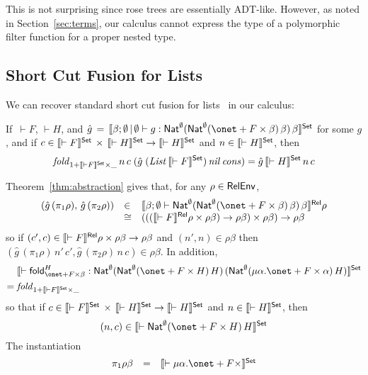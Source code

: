 \documentclass{lmcs}
\theoremstyle{plain}\newtheorem{satz}[thm]{Satz}
\newcommand{\fold}{\mathsf{fold}}
\begin{document}
{\noindent
This is not surprising since rose trees are essentially
ADT-like. However, as noted in Section~\ref{sec:terms}, our calculus
cannot express the type of a polymorphic filter function for a proper
nested type.

\subsection{Short Cut Fusion for Lists}\label{sec:short-cut}

We can recover standard short cut fusion for lists~\cite{glp93} in our
calculus: 
\begin{thm}
If \,$\vdash F$, $\vdash H$, and 
$\hat{g} \, = \, \setsem{\beta; \emptyset \,|\, \emptyset \vdash g :
  \Nat^{\emptyset} (\Nat^{\emptyset} (\onet + F \times \beta)\,
  \beta)\, \beta}$ for some $g$, and if $c \in \llbracket{\vdash F}\rrbracket^{\mathsf{Set}}
\,\times\, \llbracket{\vdash H}\rrbracket^{\mathsf{Set}} \to \llbracket{\vdash H}\rrbracket^{\mathsf{Set}}$ and $n \in
\llbracket{\vdash H}\rrbracket^{\mathsf{Set}}$, then
\[\mathit{fold}_{1 + \llbracket{\vdash F}\rrbracket^{\mathsf{Set}} \times \_}\, n\, c\; (\hat{g}\; (\mathit{List}\,
\llbracket{\vdash F}\rrbracket^{\mathsf{Set}})\,\mathit{nil} \,\mathit{cons}) = \hat{g} \,\llbracket{\vdash
  H}\rrbracket^{\mathsf{Set}}\, n\, c \]
\end{thm}
\proof
Theorem~\ref{thm:abstraction} gives
that, for any $\rho \in \mathsf{RelEnv}$,
\[\begin{array}{lll}
(\hat{g} \,(\pi_1 \rho), \,\hat{g}\, (\pi_2 \rho)) & \in 
& \relsem{\beta; \emptyset \vdash \Nat^{\emptyset} (\Nat^{\emptyset}
  (\onet + F \times \beta)\, \beta)\, \beta} \rho \\
& \cong & (((\relsem{\vdash F} \rho \times
\rho\beta) \to \rho\beta) \times \rho\beta) \to \rho\beta
\end{array}\]
so if $(c', c) \in \llbracket{\vdash F}\rrbracket^{\mathsf{Rel}} \rho \times
\rho\beta \to \rho\beta$ and $(n', n) \in \rho\beta$ then
$(\hat{g} \,(\pi_1 \rho)\, n'\, c', \hat{g}\, (\pi_2 \rho)\, n\, c)
\in \rho \beta$.
In addition,
\begin{align*}
  &\setsem{\vdash \fold_{\onet + F
    \times \beta}^{H} : \Nat^{\emptyset} (\Nat^{\emptyset} (\onet
  + F \times H)\, H)\, (\Nat^{\emptyset} (\mu \alpha. \onet
  + F \times \alpha)\, H)} \\ =\;
& \mathit{fold}_{1 + \setsem{\vdash F} \times \_}
\end{align*}
so that if $c \in
\llbracket{\vdash F}\rrbracket^{\mathsf{Set}} \,\times\, \llbracket{\vdash H}\rrbracket^{\mathsf{Set}} \to
\llbracket{\vdash H}\rrbracket^{\mathsf{Set}}$ and $n \in \llbracket{\vdash H}\rrbracket^{\mathsf{Set}}$,
 then
\[(n, c) \in \setsem{\vdash \Nat^{\emptyset} (\onet + F \times H)\,
  H}\] The instantiation
\[\begin{array}{lll}
\pi_1 \rho \beta & = & \setsem{\vdash \mu \alpha. \onet + F \times
}
\end{array}\]}
\end{document}
